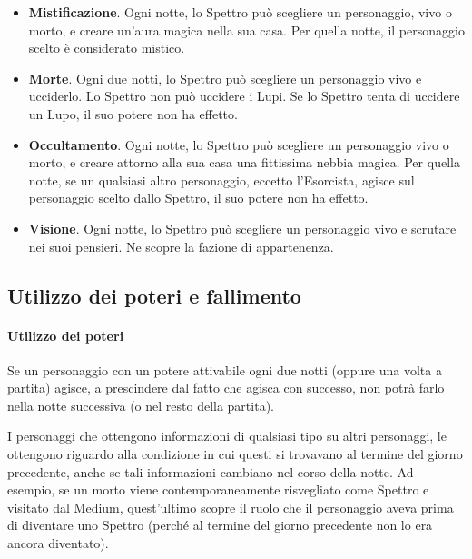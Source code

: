 \documentclass[a4paper,10pt]{article}
\begin{document}
\begin{itemize}
 \item {\bf Mistificazione}. Ogni notte, lo Spettro può scegliere un personaggio, vivo o morto, e creare un'aura magica nella sua casa. Per quella notte, il personaggio scelto è considerato mistico. 
 
 \item {\bf Morte}. Ogni due notti, lo Spettro può scegliere un personaggio vivo e ucciderlo.
 Lo Spettro non può uccidere i Lupi. Se lo Spettro tenta di uccidere un Lupo, il suo potere non ha effetto.
 
 \item {\bf Occultamento}. Ogni notte, lo Spettro può scegliere un personaggio vivo o morto, e creare attorno alla sua casa una fittissima nebbia magica. Per quella notte, se un qualsiasi altro personaggio, eccetto l'Esorcista, agisce sul personaggio scelto dallo Spettro, il suo potere non ha effetto.
 
 \item {\bf Visione}. Ogni notte, lo Spettro può scegliere un personaggio vivo e scrutare nei suoi pensieri. Ne scopre la fazione di appartenenza.
 
\end{itemize}


\subsection{Utilizzo dei poteri e fallimento}
\label{fallimento}

\paragraph{Utilizzo dei poteri} 
Se un personaggio con un potere attivabile ogni due notti (oppure una volta a partita) agisce, a prescindere dal fatto che agisca con successo, non potrà farlo nella notte successiva (o nel resto della partita).

I personaggi che ottengono informazioni di qualsiasi tipo su altri personaggi, le ottengono riguardo alla condizione in cui questi si trovavano al termine del giorno precedente, anche se tali informazioni cambiano nel corso della notte.
Ad esempio, se un morto viene contemporaneamente risvegliato come Spettro e visitato dal Medium, quest'ultimo scopre il ruolo che il personaggio aveva prima di diventare uno Spettro (perché al termine del giorno precedente non lo era ancora diventato).

\end{document}
